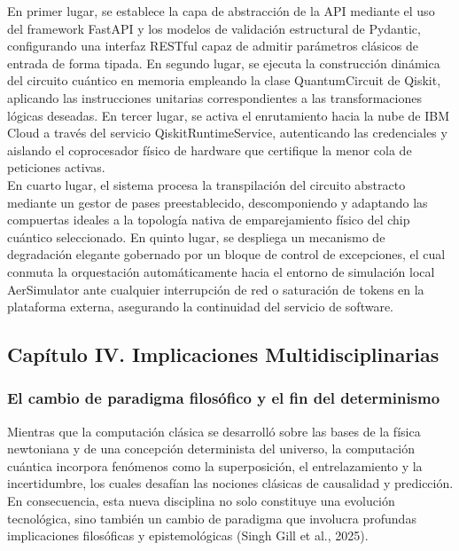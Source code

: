 \documentclass[12pt,a4paper]{article}
\begin{document}
En primer lugar, se establece la capa de abstracción de la API mediante el uso del framework FastAPI y los modelos de validación estructural de Pydantic, configurando una interfaz RESTful capaz de admitir parámetros clásicos de entrada de forma tipada. En segundo lugar, se ejecuta la construcción dinámica del circuito cuántico en memoria empleando la clase QuantumCircuit de Qiskit, aplicando las instrucciones unitarias correspondientes a las transformaciones lógicas deseadas. En tercer lugar, se activa el enrutamiento hacia la nube de IBM Cloud a través del servicio QiskitRuntimeService, autenticando las credenciales y aislando el coprocesador físico de hardware que certifique la menor cola de peticiones activas.\\

En cuarto lugar, el sistema procesa la transpilación del circuito abstracto mediante un gestor de pases preestablecido, descomponiendo y adaptando las compuertas ideales a la topología nativa de emparejamiento físico del chip cuántico seleccionado. En quinto lugar, se despliega un mecanismo de degradación elegante gobernado por un bloque de control de excepciones, el cual conmuta la orquestación automáticamente hacia el entorno de simulación local AerSimulator ante cualquier interrupción de red o saturación de tokens en la plataforma externa, asegurando la continuidad del servicio de software.

\subsection{Capítulo IV. Implicaciones Multidisciplinarias}

\subsubsection{El cambio de paradigma filosófico y el fin del determinismo}
Mientras que la computación clásica se desarrolló sobre las bases de la física newtoniana y de una concepción determinista del universo, la computación cuántica incorpora fenómenos como la superposición, el entrelazamiento y la incertidumbre, los cuales desafían las nociones clásicas de causalidad y predicción. En consecuencia, esta nueva disciplina no solo constituye una evolución tecnológica, sino también un cambio de paradigma que involucra profundas implicaciones filosóficas y epistemológicas (Singh Gill et al., 2025).\\
\end{document}
